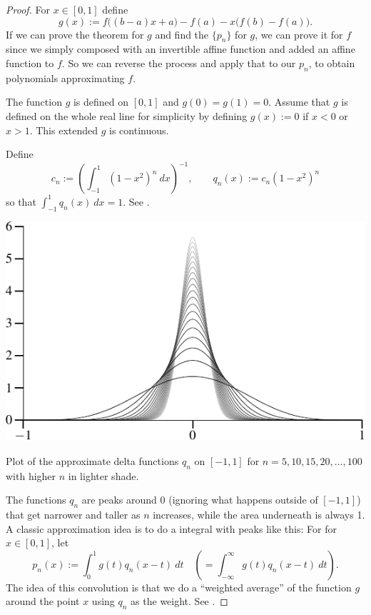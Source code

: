 \begin{proof}
For $x \in [0,1]$ define
\begin{equation*}
g(x) := f\bigl((b-a)x+a\bigr)-f(a) - x\bigl(f(b)-f(a)\bigr) .
\end{equation*}
If we can prove the theorem for $g$ and find the $\{ p_n \}$ for $g$,
we can prove it for $f$ since we simply
composed with an invertible affine function and added an affine
function to $f$.  So we can reverse the process and apply that to our
$p_n$, to obtain polynomials approximating $f$.

The function $g$ is defined on $[0,1]$ and $g(0)=g(1)=0$.  Assume that
$g$ is defined on the whole real line for simplicity by defining
$g(x) := 0$ if $x < 0$ or $x > 1$.  This extended $g$ is continuous.

Define
\begin{equation*}
c_n := {\left( \int_{-1}^1 {(1-x^2)}^n~dx \right)}^{-1} ,
\qquad
q_n(x) := c_n (1-x^2)^n
\end{equation*}
so that $\int_{-1}^1 q_n(x)~dx = 1$.
See .

\begin{myfigureht}
\includegraphics{figures/weierqn}
\caption{Plot of the approximate delta functions $q_n$ on $[-1,1]$ for
$n=5,10,15,20,\ldots,100$ with higher $n$ in lighter shade.\label{fig:weierqn}}
\end{myfigureht}

The functions $q_n$ are peaks around 0 (ignoring what happens outside
of $[-1,1]$) that get narrower and taller as $n$ increases,
while the area underneath is always 1.
A classic approximation idea
is to do a \emph{} integral with peaks like this:
For
for $x \in [0,1]$, let
\begin{equation*}
p_n(x) := \int_{0}^1 g(t)q_n(x-t) ~dt \quad \left( = \int_{-\infty}^\infty
g(t)q_n(x-t) ~dt \right) .
\end{equation*}
The idea of this convolution is that we do a ``weighted average'' of the
function $g$ around the point $x$ using $q_n$ as the weight.
See .


\end{proof}
